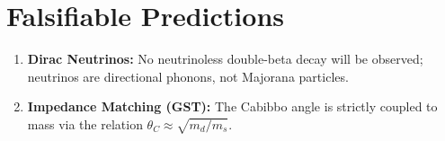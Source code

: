 \section{Falsifiable Predictions}

\begin{enumerate}
    \item \textbf{Dirac Neutrinos:} No neutrinoless double-beta decay will be observed; neutrinos are directional phonons, not Majorana particles.
    \item \textbf{Impedance Matching (GST):} The Cabibbo angle is strictly coupled to mass via the relation $\theta_C \approx \sqrt{m_d/m_s}$.
\end{enumerate}